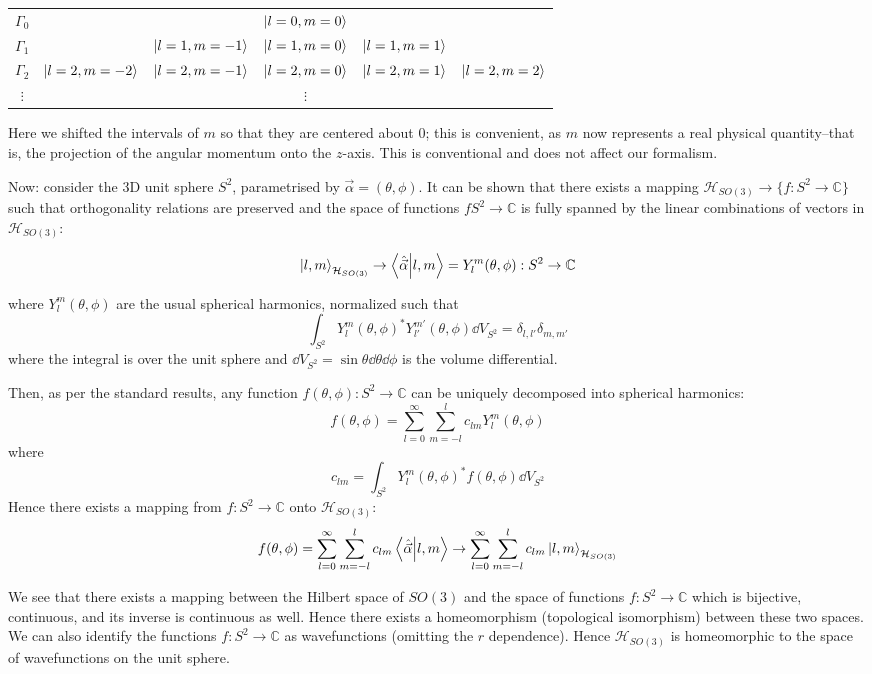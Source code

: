 \documentclass[12pt]{article}
\begin{document}
	\begin{center}
	\begin{tabular}{c|c c c c c}
	$\Gamma_0$ & & & $\ket{l=0, m=0}$ & &\\
	$\Gamma_1$ & & $\ket{l=1,m=-1}$ & $\ket{l=1,m=0}$ & $\ket{l=1,m=1}$ & \\
	$\Gamma_2$ & $\ket{l=2,m=-2}$ & $\ket{l=2,m=-1}$ & $\ket{l=2,m=0}$ & $\ket{l=2,m=1}$ & $\ket{l=2,m=2}$\\
	$\vdots$ & & & $\vdots$ & &
	\end{tabular}
	\end{center}
	
	Here we shifted the intervals of $m$ so that they are centered about $0$; this is convenient, as $m$ now represents a real physical quantity--that is, the projection of the angular momentum onto the $z$-axis. This is conventional and does not affect our formalism.
	
	Now: consider the 3D unit sphere $S^2$, parametrised by $\vec{\alpha}=(\theta, \phi)$. It can be shown that there exists a mapping $\mathcal{H}_{SO(3)}\to \{f:S^2\to\mathbb{C}\}$ such that orthogonality relations are preserved and the space of functions $fS^2\to\mathbb{C}$ is fully spanned by the linear combinations of vectors in $\mathcal{H}_{SO(3)}$:
	
	$$\ket{l,m}_{\mathcal{H}_{SO(3)}}\to \braket{\hat{\vec{\alpha}}}{l,m}=Y_l^m(\theta, \phi):S^2\to\mathbb{C}$$
	
	where $Y_l^m(\theta, \phi)$ are the usual spherical harmonics, normalized such that
	$$\int_{S^2}Y_l^m(\theta, \phi)^*Y_{l'}^{m'}(\theta, \phi)\dd{V}_{S^2}=\delta_{l,l'}\delta_{m,m'}$$
	where the integral is over the unit sphere and $\dd{V}_{S^2}=\sin{\theta}\dd{\theta} \dd{\phi}$ is the volume differential.
	
	Then, as per the standard results, any function $f(\theta,\phi):S^2\to\mathbb{C}$ can be uniquely decomposed into spherical harmonics:
	$$f(\theta,\phi)=\sum_{l=0}^\infty \sum_{m=-l}^l c_{lm} Y_l^m(\theta,\phi)$$
	where
	$$c_{lm}=\int_{S^2}Y_l^m(\theta, \phi)^*f(\theta, \phi)\dd{V}_{S^2}$$
	Hence there exists a mapping from $f:S^2\to\mathbb{C}$ onto $\mathcal{H}_{SO(3)}$:
	$$f(\theta,\phi)=\sum_{l=0}^\infty \sum_{m=-l}^l c_{lm} \braket{\hat{\vec{\alpha}}}{l,m}\to \sum_{l=0}^\infty \sum_{m=-l}^l c_{lm} \ket{l,m}_{\mathcal{H}_{SO(3)}}$$	
	
	We see that there exists a mapping between the Hilbert space of $SO(3)$ and the space of functions $f:S^2\to \mathbb{C}$ which is bijective, continuous, and its inverse is continuous as well. Hence there exists a homeomorphism (topological isomorphism) between these  two spaces. We can also identify the functions $f:S^2\to \mathbb{C}$ as wavefunctions (omitting the $r$ dependence). Hence $\mathcal{H}_{SO(3)}$ is homeomorphic to the space of wavefunctions on the unit sphere.
	
\end{document}
